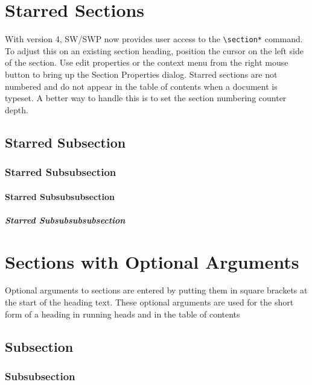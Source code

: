\documentclass{article}
\begin{document}
\section*{Starred Sections}

With version 4, SW/SWP now provides user access to the \verb|\section*|
command. To adjust this on an existing section heading, position the cursor
on the left side of the section. Use edit properties or the context menu
from the right mouse button to bring up the Section Properties dialog.
Starred sections are not numbered and do not appear in the table of contents
when a document is typeset. A better way to handle this is to set the
section numbering counter depth.

\subsection*{Starred Subsection}

\subsubsection*{Starred Subsubsection}

\paragraph*{Starred Subsubsubsection}

\subparagraph*{Starred Subsubsubsubsection}

\section[Short Form]{Sections with Optional Arguments}

Optional arguments to sections are entered by putting them in square
brackets at the start of the heading text. These optional arguments are used
for the short form of a heading in running heads and in the table of contents

\subsection[Short Form]{Subsection}

\subsubsection[Short Form]{Subsubsection}
\end{document}
